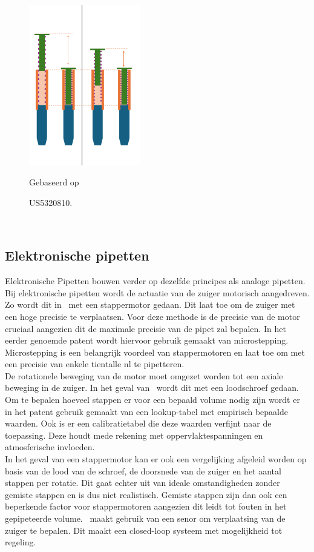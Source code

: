 \begin{minipage}[t]{0.49\textwidth}
    \vspace{0pt}
    \begin{figure}[H]
        \centering
        \includegraphics[height=7cm]{figures/Werking US5320810.png}
        \caption{US5320810.}\label{fig:werking US5320810}
        Gebaseerd op\ \cite{RN17}
    \end{figure}
\end{minipage}\\

\subsection{Elektronische pipetten}
Elektronische Pipetten bouwen verder op dezelfde principes als analoge pipetten. Bij elektronische pipetten wordt de actuatie van de zuiger motorisch aangedreven. Zo wordt dit in\ \cite{RN35} met een stappermotor gedaan. Dit laat toe om de zuiger met een hoge precisie te verplaatsen. Voor deze methode is de precisie van de motor cruciaal aangezien dit de maximale precisie van de pipet zal bepalen. In het eerder genoemde patent wordt hiervoor gebruik gemaakt van microstepping. Microstepping is een belangrijk voordeel van stappermotoren en laat toe om met een precisie van enkele tientalle nl te pipetteren. 
\\[12pt]De rotationele beweging van de motor moet omgezet worden tot een axiale beweging in de zuiger. In het geval van\ \cite{RN35} wordt dit met een loodschroef gedaan. Om te bepalen hoeveel stappen er voor een bepaald volume nodig zijn wordt er in het patent gebruik gemaakt van een lookup-tabel met empirisch bepaalde waarden. Ook is er een calibratietabel die deze waarden verfijnt naar de toepassing. Deze houdt mede rekening met oppervlaktespanningen en atmosferische invloeden. 
\\[12pt]In het geval van een stappermotor kan er ook een vergelijking afgeleid worden op basis van de lood van de schroef, de doorsnede van de zuiger en het aantal stappen per rotatie. Dit gaat echter uit van ideale omstandigheden zonder gemiste stappen en is dus niet realistisch. Gemiste stappen zijn dan ook een beperkende factor voor stappermotoren aangezien dit leidt tot fouten in het gepipeteerde volume.\ \cite{RN36} maakt gebruik van een senor om verplaatsing van de zuiger te bepalen. Dit maakt een closed-loop systeem met mogelijkheid tot regeling.

